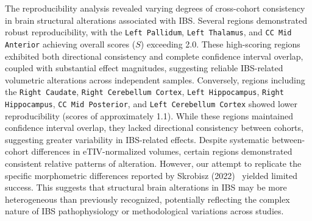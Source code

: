\documentclass[diagnostics,article,accept,pdftex,moreauthors]{Definitions/mdpi}
\begin{document}
The reproducibility analysis revealed varying degrees of cross-cohort consistency in brain structural alterations associated with IBS. Several regions demonstrated robust reproducibility, with the \texttt{Left Pallidum}, \texttt{Left Thalamus}, and \texttt{CC Mid Anterior} achieving overall scores ($S$) exceeding 2.0. These high-scoring regions exhibited both directional consistency and complete confidence interval overlap, coupled with substantial effect magnitudes, suggesting reliable IBS-related volumetric alterations across independent samples. Conversely, regions including the \texttt{Right Caudate}, \texttt{Right Cerebellum Cortex}, \texttt{Left Hippocampus}, \texttt{Right Hippocampus}, \texttt{CC Mid Posterior}, and \texttt{Left Cerebellum Cortex} showed lower reproducibility (scores of approximately 1.1). While these regions maintained confidence interval overlap, they lacked directional consistency between cohorts, suggesting greater variability in IBS-related effects. Despite systematic between-cohort differences in eTIV-normalized volumes, certain regions demonstrated consistent relative patterns of alteration. However, our attempt to replicate the specific morphometric differences reported by Skrobisz (2022)~\cite{Skrobisz2022} %
yielded limited success. This suggests that structural brain alterations in IBS may be more heterogeneous than previously recognized, potentially reflecting the complex nature of IBS pathophysiology or methodological variations across studies.
\end{document}
